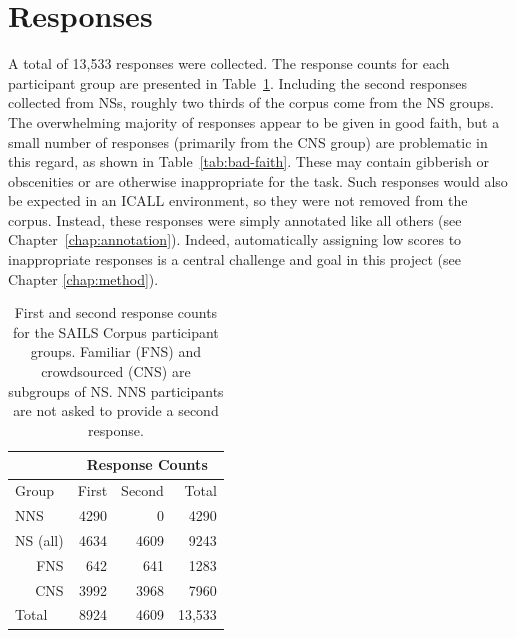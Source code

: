 \section{Responses}
\label{sec:responses}

A total of 13,533 responses were collected. The response counts for each participant group are presented in Table~\ref{tab:response-counts}. Including the second responses collected from NSs, roughly two thirds of the corpus come from the NS groups. The overwhelming majority of responses appear to be given in good faith, but a small number of responses (primarily from the CNS group) are problematic in this regard, as shown in Table~\ref{tab:bad-faith}. These may contain gibberish or obscenities or are otherwise inappropriate for the task. Such responses would also be expected in an ICALL environment, so they were not removed from the corpus. Instead, these responses were simply annotated like all others (see Chapter~\ref{chap:annotation}). Indeed, automatically assigning low scores to inappropriate responses is a central challenge and goal in this project (see Chapter \ref{chap:method}).

\begin{table}[htb!]
\begin{center}
\begin{tabular}{|l||r|r||r|}
\hline
& \multicolumn{3}{|c|}{Response Counts} \\
\hline
 Group & First & Second & Total \\
\hline
\hline
NNS & 4290 & 0 & 4290 \\
\hline
\hline
NS (all) & 4634 & 4609 & 9243 \\ %
\hline
\multicolumn{1}{|r||}{FNS} & 642 & 641 & 1283 \\ 
\hline
\multicolumn{1}{|r||}{CNS} & 3992 & 3968 & 7960 \\
\hline
\hline
Total & 8924 & 4609 & 13,533 \\
\hline
\end{tabular}
\caption{\label{tab:response-counts} First and second response counts for the SAILS Corpus participant groups. Familiar (FNS) and crowdsourced (CNS) are subgroups of NS. NNS participants are not asked to provide a second response.}
\end{center}
\end{table}

